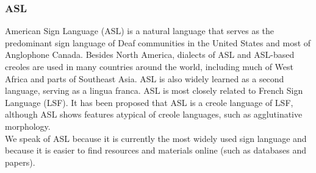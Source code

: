 \subsubsection*{ASL}
American Sign Language (ASL) is a natural language that serves as the predominant sign language of Deaf communities in the United States and most of Anglophone Canada. Besides North America, dialects of ASL and ASL-based creoles are used in many countries around the world, including much of West Africa and parts of Southeast Asia. ASL is also widely learned as a second language, serving as a lingua franca. ASL is most closely related to French Sign Language (LSF). It has been proposed that ASL is a creole language of LSF, although ASL shows features atypical of creole languages, such as agglutinative morphology.\\
We speak of ASL because it is currently the most widely used sign language and because it is easier to find resources and materials online (such as databases and papers).